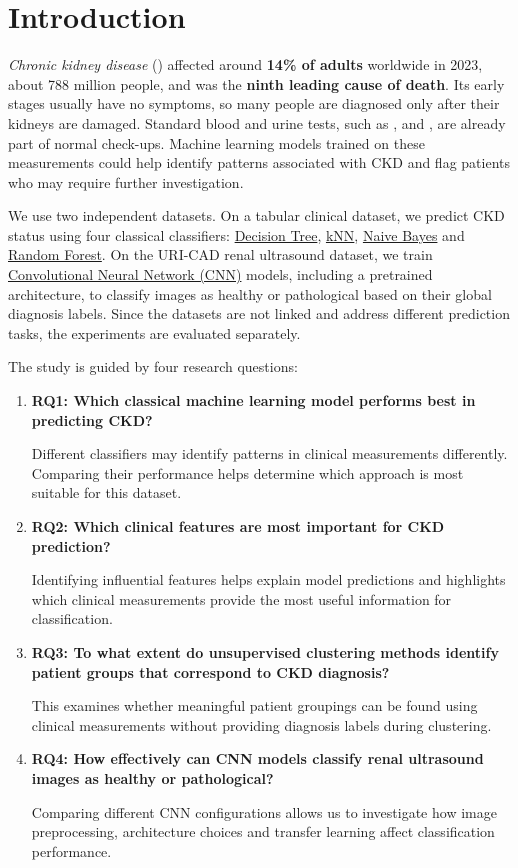 \section{Introduction}

\emph{Chronic kidney disease} () affected around \textbf{14\% of adults} worldwide in 2023, about 788 million people, and was the \textbf{ninth leading cause of death}.\cite{gbd2023ckd} Its early stages usually have no symptoms, so many people are diagnosed only after their kidneys are damaged. Standard blood and urine tests, such as ,  and , are already part of normal check-ups. Machine learning models trained on these measurements could help identify patterns associated with CKD and flag patients who may require further investigation.

We use two independent datasets. On a tabular clinical dataset, we predict CKD status using four classical classifiers: \hyperref[sec:dt]{Decision Tree}, \hyperref[sec:knn]{kNN}, \hyperref[sec:nb]{Naive Bayes} and \hyperref[sec:rf]{Random Forest}. On the URI-CAD renal ultrasound dataset\cite{uricad2024}, we train \hyperref[sec:cnn]{Convolutional Neural Network (CNN)} models, including a pretrained architecture, to classify images as healthy or pathological based on their global diagnosis labels. Since the datasets are not linked and address different prediction tasks, the experiments are evaluated separately.

The study is guided by four research questions:

\begin{enumerate}
    \item \textbf{RQ1: Which classical machine learning model performs best in predicting CKD?}

    Different classifiers may identify patterns in clinical measurements differently. Comparing their performance helps determine which approach is most suitable for this dataset.

    \item \textbf{RQ2: Which clinical features are most important for CKD prediction?}

    Identifying influential features helps explain model predictions and highlights which clinical measurements provide the most useful information for classification.

    \item \textbf{RQ3: To what extent do unsupervised clustering methods identify patient groups that correspond to CKD diagnosis?}

    This examines whether meaningful patient groupings can be found using clinical measurements without providing diagnosis labels during clustering.

    \item \textbf{RQ4: How effectively can CNN models classify renal ultrasound images as healthy or pathological?}

    Comparing different CNN configurations allows us to investigate how image preprocessing, architecture choices and transfer learning affect classification performance.
\end{enumerate}
